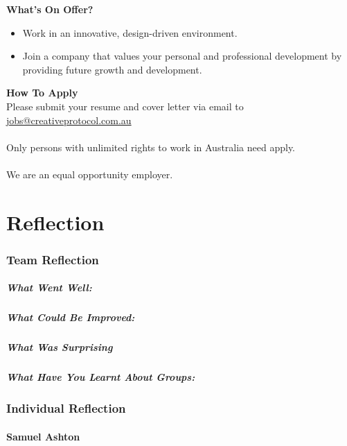 \documentclass[11pt, oneside, a4paper, titlepage]{article}
\begin{document}
\hfill \break
\textbf{What's On Offer?}
\begin{itemize}
	\item Work in an innovative, design-driven environment. 
    	\item Join a company that values your personal and professional development by providing future growth and development.  
\end{itemize}
\hfill \break
\textbf{How To Apply}
\\
Please submit your resume and cover letter via email to \href{mailto:jobs@creativeprotocol.com.au}{jobs@creativeprotocol.com.au}
\\
\\
Only persons with unlimited rights to work in Australia need apply. 
\\
\\
We are an equal opportunity employer. 
\newpage


\part{Reflection}
\section{Team Reflection}
\subsubsection{What Went Well:}


\subsubsection{What Could Be Improved:}


\subsubsection{What Was Surprising}


\subsubsection{What Have You Learnt About Groups:}


\section{Individual Reflection}

\subsection{Samuel Ashton}
\end{document}
